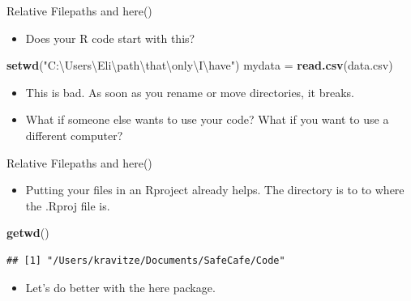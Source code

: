 \documentclass[ignorenonframetext,]{beamer}
\newenvironment{Shaded}{\begin{snugshade}}{\end{snugshade}}
\newcommand{\CharTok}[1]{\textcolor[rgb]{0.31,0.60,0.02}{#1}}
\newcommand{\KeywordTok}[1]{\textcolor[rgb]{0.13,0.29,0.53}{\textbf{#1}}}
\newcommand{\NormalTok}[1]{#1}
\newcommand{\StringTok}[1]{\textcolor[rgb]{0.31,0.60,0.02}{#1}}
\providecommand{\tightlist}{%
  \setlength{\itemsep}{0pt}\setlength{\parskip}{0pt}}
\begin{document}
\begin{frame}[fragile]{Relative Filepaths and here()}
\protect\hypertarget{relative-filepaths-and-here}{}

\begin{itemize}
\tightlist
\item
  Does your R code start with this?
\end{itemize}

\begin{Shaded}
\begin{Highlighting}[]
\KeywordTok{setwd}\NormalTok{(}\StringTok{"C:\textbackslash{}Users\textbackslash{}Eli\textbackslash{}path}\CharTok{\textbackslash{}t}\StringTok{hat\textbackslash{}only\textbackslash{}I\textbackslash{}have"}\NormalTok{)}
\NormalTok{mydata =}\StringTok{ }\KeywordTok{read.csv}\NormalTok{(data.csv)}
\end{Highlighting}
\end{Shaded}

\begin{itemize}
\item
  This is \alert{bad}. As soon as you rename or move directories, it
  breaks.
\item
  What if someone else wants to use your code? What if you want to use a
  different computer?
\end{itemize}

\end{frame}

\begin{frame}[fragile]{Relative Filepaths and here()}
\protect\hypertarget{relative-filepaths-and-here-1}{}

\begin{itemize}
\tightlist
\item
  Putting your files in an Rproject already helps. The directory is to
  to where the .Rproj file is.
\end{itemize}

\begin{Shaded}
\begin{Highlighting}[]
\KeywordTok{getwd}\NormalTok{()}
\end{Highlighting}
\end{Shaded}

\begin{verbatim}
## [1] "/Users/kravitze/Documents/SafeCafe/Code"
\end{verbatim}

\begin{itemize}
\tightlist
\item
  Let’s do better with the here package.
\end{itemize}

\end{frame}
\end{document}
